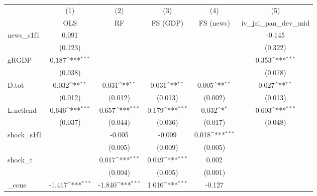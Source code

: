 {
\def\sym#1{\ifmmode^{#1}\else\(^{#1}\)\fi}
\begin{tabular}{l*{5}{c}}
\toprule
            &\multicolumn{1}{c}{(1)}&\multicolumn{1}{c}{(2)}&\multicolumn{1}{c}{(3)}&\multicolumn{1}{c}{(4)}&\multicolumn{1}{c}{(5)}\\
            &\multicolumn{1}{c}{OLS}&\multicolumn{1}{c}{RF}&\multicolumn{1}{c}{FS (GDP)}&\multicolumn{1}{c}{FS (news)}&\multicolumn{1}{c}{iv\_jai\_pan\_dev\_mid}\\
\midrule
news\_s1f1   &       0.091         &                     &                     &                     &      -0.145         \\
            &     (0.123)         &                     &                     &                     &     (0.322)         \\
\addlinespace
gRGDP       &       0.187\sym{***}&                     &                     &                     &       0.353\sym{***}\\
            &     (0.038)         &                     &                     &                     &     (0.078)         \\
\addlinespace
D.tot       &       0.032\sym{**} &       0.031\sym{**} &       0.031\sym{**} &       0.005\sym{**} &       0.027\sym{**} \\
            &     (0.012)         &     (0.012)         &     (0.013)         &     (0.002)         &     (0.013)         \\
\addlinespace
L.netlend   &       0.646\sym{***}&       0.657\sym{***}&       0.179\sym{***}&       0.032\sym{*}  &       0.603\sym{***}\\
            &     (0.037)         &     (0.044)         &     (0.036)         &     (0.017)         &     (0.048)         \\
\addlinespace
shock\_s1f1  &                     &      -0.005         &      -0.009         &       0.018\sym{***}&                     \\
            &                     &     (0.005)         &     (0.009)         &     (0.005)         &                     \\
\addlinespace
shock\_t     &                     &       0.017\sym{***}&       0.049\sym{***}&       0.002         &                     \\
            &                     &     (0.004)         &     (0.005)         &     (0.001)         &                     \\
\addlinespace
\_cons      &      -1.417\sym{***}&      -1.840\sym{***}&       1.010\sym{***}&      -0.127         &                     \\

\end{tabular}}
